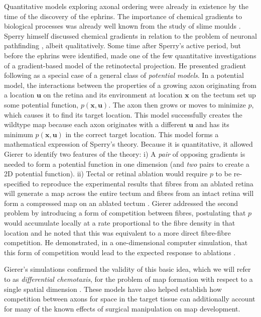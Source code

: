 \documentclass[11pt, a4paper]{article}
\begin{document}
Quantitative models exploring axonal ordering were already in existence by the time of the discovery of the ephrins. 
The importance of chemical gradients to biological processes was already well known from the study of slime moulds \citep{bonner_evidence_1947}. 
Sperry himself discussed chemical gradients in relation to the problem of neuronal pathfinding \citep{sperry_problems_1955}, albeit qualitatively.  
Some time after Sperry's active period, but before the ephrins were identified, \citet{gierer_development_1981,gierer_model_1983,gierer_directional_1987} made one of the few quantitative investigations of a gradient-based model of the retinotectal projection. He presented gradient following as a special case of a general class of \emph{potential models}. 
In a potential model, the interactions between the properties of a growing axon originating from a location $\mathbf{u}$ on the retina and its environment at location $\mathbf{x}$ on the tectum set up some potential function, $p(\mathbf{x},\mathbf{u})$. 
The axon then grows or moves to minimize $p$, which causes it to find its target location. This model successfully creates the wildtype map because each axon originates with a different $\mathbf{u}$ and has its minimum $p(\mathbf{x},\mathbf{u})$ in the correct target location.
This model forms a mathematical expression of Sperry's theory. Because it is quantitative, it allowed Gierer to identify two features of the theory: i) A \emph{pair} of opposing gradients is needed to form a potential function in one dimension (and \emph{two} pairs to create a 2D potential function). ii) Tectal or retinal ablation would require $p$ to be re-specified to reproduce the experimental results that fibres from an ablated retina will generate a map across the entire tectum and fibres from an intact retina will form a compressed map on an ablated tectum \citep{attardi_preferential_1963,schmidt_retinal_1978,schmidt_expansion_1978}.
Gierer addressed the second problem by introducing a form of competition between fibres, postulating that $p$ would accumulate locally at a rate proportional to the fibre density in that location and he noted that this was equivalent to a more direct fibre-fibre competition.
He demonstrated, in a one-dimensional computer simulation, that this form of competition would lead to the expected response to ablations \citep{gierer_model_1983}.

Gierer's simulations confirmed the validity of this basic idea, which we will refer to as \emph{differential chemotaxis}, for the problem of map formation with respect to a single spatial dimension \citep{gierer_model_1983,karbowski_model_2004}. 
These models have also helped establish how competition between axons for space in the target tissue can additionally account for many of the known effects of surgical manipulation on map development.
\end{document}
